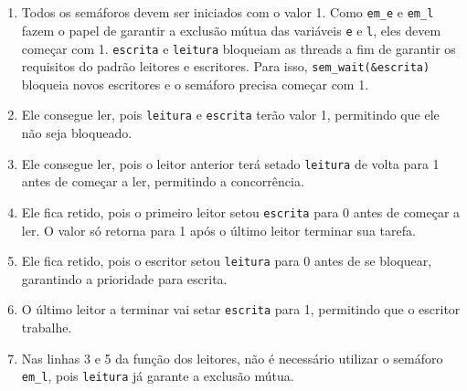 \documentclass[12pt]{article}
\begin{document}
\section{}
\begin{enumerate}
	\item
		Todos os semáforos devem
		ser iniciados com o valor 1.
		Como \texttt{em\_e} e \texttt{em\_l} fazem
		o papel de garantir
		a exclusão mútua das
		variáveis \texttt{e} e \texttt{l},
		eles devem começar com 1.
		\texttt{escrita} e \texttt{leitura}
		bloqueiam as threads
		a fim de garantir os requisitos
		do padrão leitores e escritores.
		Para isso,
		\texttt{sem\_wait(\&escrita)} bloqueia 
		novos escritores e
		o semáforo precisa começar com 1.
	\item
		Ele consegue ler,
		pois \texttt{leitura} e \texttt{escrita}
		terão valor 1,
		permitindo que ele
		não seja bloqueado.
	\item
		Ele consegue ler,
		pois o leitor anterior
		terá setado \texttt{leitura}
		de volta para 1
		antes de começar a ler,
		permitindo a concorrência.
	\item
		Ele fica retido,
		pois o primeiro leitor
		setou \texttt{escrita} para 0
		antes de começar a ler.
		O valor só retorna para 1
		após o último leitor
		terminar sua tarefa.
	\item
		Ele fica retido,
		pois o escritor
		setou \texttt{leitura} para 0
		antes de se bloquear,
		garantindo a prioridade para escrita.
	\item
		O último leitor a terminar
		vai setar \texttt{escrita} para 1,
		permitindo que o escritor trabalhe.
	\item
		Nas linhas 3 e 5 da função dos leitores,
		não é necessário utilizar
		o semáforo \texttt{em\_l},
		pois \texttt{leitura} já
		garante a exclusão mútua.
\end{enumerate}
\end{document}
